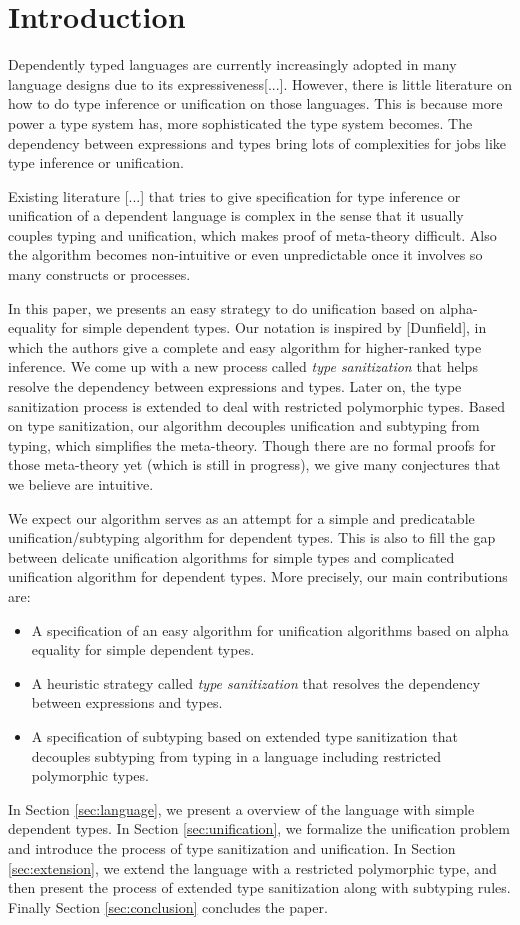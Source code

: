 \section{Introduction}

Dependently typed languages are currently increasingly adopted in many language
designs due to its expressiveness[...]. However, there is little literature on
how to do type inference or unification on those languages. This is because
more power a type system has, more sophisticated the type system
becomes. The dependency between expressions and types bring lots of complexities
for jobs like type inference or unification.

Existing literature [...] that tries to give specification for type inference
or unification of
a dependent language is complex in the sense that it usually couples typing
and unification, which makes proof of meta-theory difficult.
Also the algorithm becomes non-intuitive or even unpredictable once it involves
so many constructs or processes.

In this paper, we presents an easy strategy to do unification based on
alpha-equality for simple dependent
types. Our notation is inspired by [Dunfield], in which the authors give a complete
and easy algorithm for higher-ranked type inference. We come up with a new
process called \textit{type sanitization} that helps resolve the dependency
between expressions and types. Later on, the type sanitization process is
extended to deal with restricted polymorphic types.
Based on type sanitization, our algorithm
decouples unification and subtyping from typing, which simplifies the
meta-theory. Though there are no formal proofs for those meta-theory yet (which
is still in progress),
we give many conjectures that we believe are intuitive.

We expect our algorithm serves as an attempt
for a simple and predicatable unification/subtyping algorithm for dependent
types. This is also to
fill the gap between
delicate unification algorithms for simple types
and
complicated unification algorithm for dependent types.
More precisely, our main contributions are:

\begin{itemize}
  \item A specification of an easy algorithm for unification algorithms based on
    alpha equality for
    simple dependent types.
  \item A heuristic strategy called \textit{type sanitization} that resolves the
    dependency between expressions and types.
  \item A specification of subtyping based on extended type sanitization that
    decouples
      subtyping from typing in a language including restricted polymorphic types.
\end{itemize}

In Section \ref{sec:language}, we present a overview of the language with simple
dependent types. In Section \ref{sec:unification}, we formalize the unification
problem and introduce the process of type sanitization and unification. In
Section \ref{sec:extension}, we extend the language with a restricted
polymorphic type, and then present the process of extended type sanitization
along with subtyping rules. Finally Section \ref{sec:conclusion} concludes the
paper.